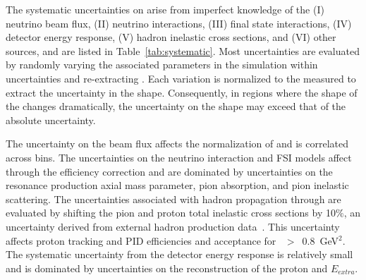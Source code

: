 
The systematic uncertainties on \xsecproton arise from  
imperfect knowledge of the (I) neutrino beam flux, (II) neutrino interactions, 
(III) final state interactions, (IV) detector energy response, 
(V) hadron inelastic cross sections, and (VI) other sources, and 
are listed in Table~\ref{tab:systematic}.  Most uncertainties are
evaluated by randomly varying the associated parameters 
in the simulation within uncertainties and re-extracting 
\xsecproton. Each variation is normalized to the measured
\xsecproton to extract the uncertainty in the shape. Consequently, in regions
where the shape of the \xsecproton changes dramatically, the uncertainty on
the shape may exceed that of the absolute uncertainty. 

The uncertainty on the beam flux affects the normalization of \xsecproton 
and is correlated across \QSqproton bins. The uncertainties on the 
neutrino interaction and FSI models affect \xsecproton through the efficiency 
correction and are dominated by uncertainties on the resonance production axial mass 
parameter, pion absorption, and pion inelastic scattering. The uncertainties
associated with hadron propagation through \minerva 
are evaluated by shifting the pion and proton total inelastic cross sections 
by 10$\%$, an uncertainty derived from external hadron production 
data~\cite{Lee:2002eq,Ashery:1981tq,Allardyce:1973ce,Saunders:1996ic}. 
This uncertainty affects proton tracking and PID efficiencies and acceptance 
for \QSqproton~$>$~0.8~GeV$^{2}$. 
The systematic uncertainty from the detector energy response is relatively small and 
is dominated by uncertainties on the reconstruction of the proton and $E_{extra}$.

